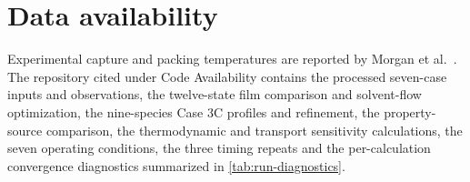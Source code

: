 \section*{Data availability}
Experimental capture and packing temperatures are reported by Morgan et al.\ \cite{Morgan2020}.
The repository cited under Code Availability contains the processed seven-case inputs and observations, the twelve-state film comparison and solvent-flow optimization, the nine-species Case 3C profiles and refinement, the property-source comparison, the thermodynamic and transport sensitivity calculations, the seven operating conditions, the three timing repeats and the per-calculation convergence diagnostics summarized in \cref{tab:run-diagnostics}.
